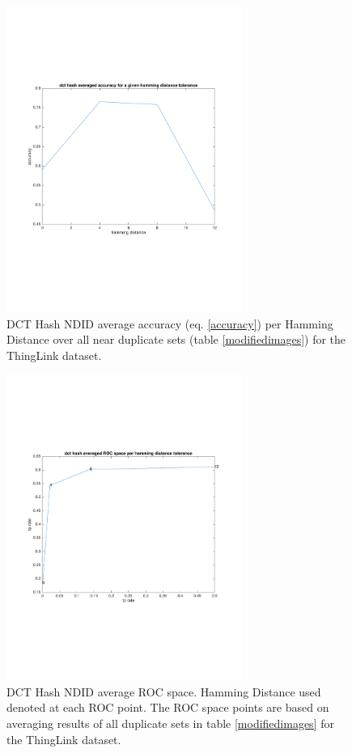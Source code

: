 \documentclass[english,12pt,a4paper,pdftex,elec,utf8]{aaltothesis}
\begin{document}
\begin{figure}[htb]
\begin{center}
\includegraphics[height=10cm]{figures/thinglink_dctTotalAccuracy}
\end{center}
\caption{DCT Hash NDID average accuracy (eq. \ref{accuracy}) per Hamming Distance over all near duplicate sets (table \ref{modifiedimages}) for the ThingLink dataset.}
\label{thinglinkdcttotalaccuracy}
\end{figure}

\begin{figure}[htb]
\begin{center}
\includegraphics[height=10cm]{figures/thinglink_dctTotalROC}
\end{center}
\caption{DCT Hash NDID average ROC space. Hamming Distance used denoted at each ROC point. The ROC space points are based on averaging results of all duplicate sets in table \ref{modifiedimages} for the ThingLink dataset.}
\label{thinglinkdcttotalroc}
\end{figure}
\end{document}
